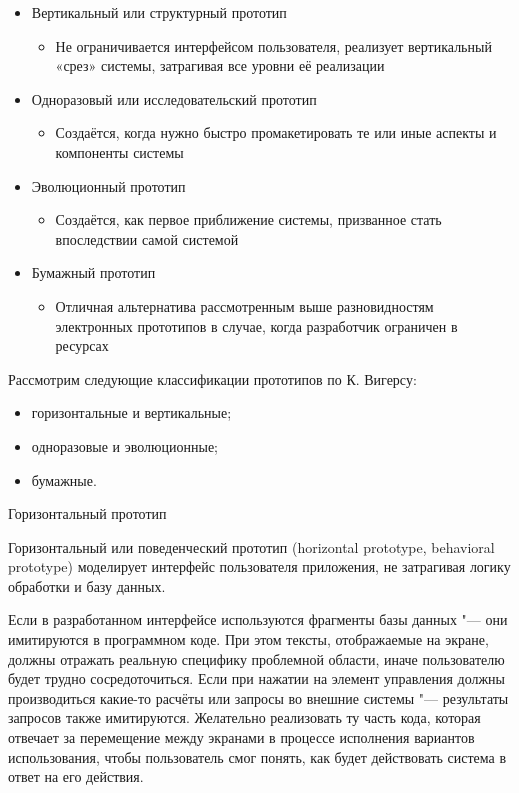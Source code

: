 \documentclass{../industrial-development}
\begin{document}
{\begin{frame}
\begin{itemize}
\item \alert{Вертикальный или структурный прототип} 
\begin{itemize}
\item Не ограничивается интерфейсом пользователя, реализует вертикальный «срез» системы, затрагивая все уровни её реализации
\end{itemize}

\item \alert{Одноразовый или исследовательский прототип} 
\begin{itemize}
\item Создаётся, когда нужно быстро промакетировать те или иные аспекты и компоненты системы
\end{itemize}
\item \alert{Эволюционный прототип} 
\begin{itemize} 
\item Создаётся, как первое приближение системы, призванное стать впоследствии самой системой
\end{itemize}
\item \alert{Бумажный прототип} 
\begin{itemize}
\item Отличная альтернатива рассмотренным выше разновидностям электронных прототипов в случае, когда разработчик ограничен в
ресурсах
\end{itemize}
\end{itemize}
\end{frame}

\lecturenotes

Рассмотрим следующие классификации прототипов по К. Вигерсу:

\begin{itemize}
\item горизонтальные и вертикальные;
\item одноразовые и эволюционные;
\item бумажные.
\end{itemize}

\alert{Горизонтальный прототип}

Горизонтальный или поведенческий прототип (horizontal prototype, behavioral prototype) моделирует интерфейс пользователя приложения, не затрагивая логику обработки и базу данных.

Если в разработанном интерфейсе используются фрагменты базы данных "--- они имитируются в программном коде. При этом тексты, отображаемые на экране, должны отражать реальную специфику проблемной области, иначе пользователю будет трудно сосредоточиться. Если при нажатии на элемент управления должны производиться какие-то расчёты или запросы во внешние системы "--- результаты запросов также имитируются. Желательно реализовать ту часть кода, которая отвечает за перемещение между экранами в процессе исполнения вариантов использования, чтобы пользователь смог понять, как будет действовать система в ответ на его действия.

}
\end{document}

